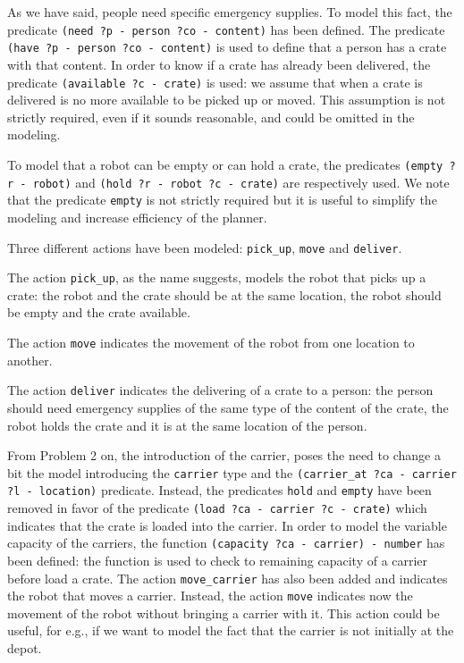 As we have said, people need specific emergency supplies. To model this fact, the predicate
\texttt{(need ?p - person ?co - content)} has been defined. The predicate 
\texttt{(have ?p - person ?co - content)} is used to define that a person has a crate with that content.
In order to know if a crate has already been delivered, the predicate \texttt{(available ?c - crate)}
is used: we assume that when a crate is delivered is no more available to be picked up or moved.
This assumption is not strictly required, even if it sounds reasonable, and could be omitted in the modeling.


To model that a robot can be empty or can hold a crate, the predicates \texttt{(empty ?r - robot)} and
\texttt{(hold ?r - robot ?c - crate)} are respectively used.
We note that the predicate \texttt{empty} is not strictly required but it is useful to simplify the modeling
and increase efficiency of the planner.


Three different actions have been modeled: \texttt{pick\_up}, 
\texttt{move} and \texttt{deliver}.

The action \texttt{pick\_up}, as the name suggests, models the robot that picks up a crate:
the robot and the crate should be at the same location, the robot should be empty and the crate available.

The action \texttt{move} indicates the movement of the robot from one location to another.

The action \texttt{deliver} indicates the delivering of a crate to a person: the person should need emergency
supplies of the same type of the content of the crate, the robot holds the crate and it is at the same location
of the person.


From Problem 2 on, the introduction of the carrier, poses the need to change a bit the model 
introducing the \texttt{carrier} type and the \texttt{(carrier\_at ?ca - carrier ?l - location)} predicate.
Instead, the predicates \texttt{hold} and \texttt{empty} have been removed in favor of the predicate
\texttt{(load ?ca - carrier ?c - crate)} which indicates that the crate is loaded into the carrier.
In order to model the variable capacity of the carriers, the function \texttt{(capacity ?ca - carrier) - number}
has been defined: the function is used to check to remaining capacity of a carrier before load a crate.
The action \texttt{move\_carrier} has also been added and indicates the robot that moves a carrier.
Instead, the action \texttt{move} indicates now the movement of the robot without bringing a carrier with it.
This action could be useful, for e.g., if we want to model the fact that the carrier is not initially at 
the depot.

